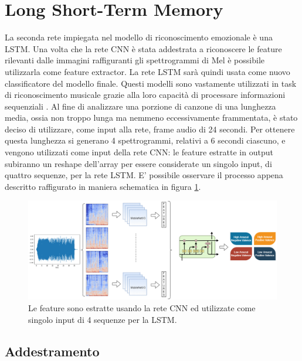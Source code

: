 \documentclass[11pt]{report}
\begin{document}
\newpage

\section{Long Short-Term Memory}


La seconda rete impiegata nel modello di riconoscimento emozionale è una LSTM. Una volta che la rete CNN è stata addestrata a riconoscere le feature rilevanti dalle immagini raffiguranti gli spettrogrammi di Mel è possibile utilizzarla come feature extractor. La rete LSTM sarà quindi usata come nuovo classificatore del modello finale. Questi modelli sono vastamente utilizzati in task di riconoscimento musicale grazie alla loro capacità di processare informazioni sequenziali \cite{hochreiter1997long}. Al fine di analizzare una porzione di canzone di una lunghezza media, ossia non troppo lunga ma nemmeno eccessivamente frammentata, è stato deciso di utilizzare, come input alla rete, frame audio di 24 secondi. Per ottenere questa lunghezza si generano 4 spettrogrammi, relativi a 6 secondi ciascuno, e vengono utilizzati come input della rete CNN: le feature estratte in output subiranno un reshape dell'array per essere considerate un singolo input, di quattro sequenze, per la rete LSTM. E' possibile osservare il processo appena descritto raffigurato in maniera schematica in figura \ref{fig:lstm-feature}.

\vspace{2cm}

\begin{figure}[h]
\centering
\includegraphics[scale = 0.52]{img/LSTM-Training.png}
\caption{Le feature sono estratte usando la rete CNN ed utilizzate come singolo input di 4 sequenze per la LSTM.}
\label{fig:lstm-feature}
\end{figure}

\newpage


\subsection{Addestramento}
\end{document}
